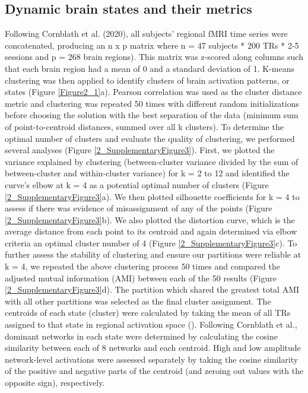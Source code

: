 \documentclass[phd,tocprelim]{cornell}
\begin{document}
	\subsection{Dynamic brain states and their metrics}
	 Following Cornblath et al. (2020), all subjects’ regional fMRI time series were concatenated, producing an n x p matrix where n = 47 subjects * 200 TRs * 2-5 sessions and p = 268 brain regions). This matrix was z-scored along columns such that each brain region had a mean of 0 and a standard deviation of 1. K-means clustering was then applied to identify clusters of brain activation patterns, or states (Figure \ref{Figure2_1}a). Pearson correlation was used as the cluster distance metric and clustering was repeated 50 times with different random initializations before choosing the solution with the best separation of the data (minimum sum of point-to-centroid distances, summed over all k clusters). To determine the optimal number of clusters and evaluate the quality of clustering, we performed several analyses (Figure \ref{2_SupplementaryFigure3}). First, we plotted the variance explained by clustering (between-cluster variance divided by the sum of between-cluster and within-cluster variance) for k = 2 to 12 and identified the curve's elbow at k = 4 as a potential optimal number of clusters (Figure \ref{2_SupplementaryFigure3}a). We then plotted silhouette coefficients for k = 4 to assess if there was evidence of misassignment of any of the points (Figure \ref{2_SupplementaryFigure3}b). We also plotted the distortion curve, which is the average distance from each point to its centroid and again determined via elbow criteria an optimal cluster number of 4 (Figure \ref{2_SupplementaryFigure3}c).  To further assess the stability of clustering and ensure our partitions were reliable at k = 4, we repeated the above clustering process 50 times and compared the adjusted mutual information (AMI) between each of the 50 results (Figure \ref{2_SupplementaryFigure3}d). The partition which shared the greatest total AMI with all other partitions was selected as the final cluster assignment. The centroids of each state (cluster) were calculated by taking the mean of all TRs assigned to that state in regional activation space (\cite{Cornblath2020-nc}). Following Cornblath et al., dominant networks in each state were determined by calculating the cosine similarity between each of 8  networks and each centroid. High and low amplitude network-level activations were assessed separately by taking the cosine similarity of the positive and negative parts of the centroid (and zeroing out values with the opposite sign), respectively. 
	 
\end{document}
